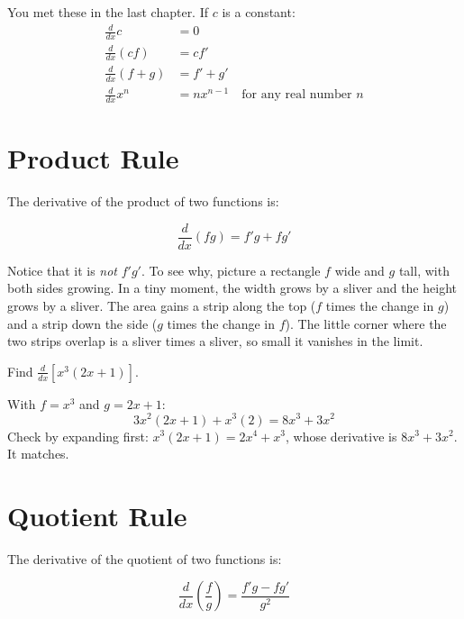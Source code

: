 You met these in the last chapter. If $c$ is a constant:
\begin{align}
\frac{d}{dx}c &= 0\\
\frac{d}{dx}\left(c f\right) &= c f'\\
\frac{d}{dx}\left(f + g\right) &= f' + g'\\
\frac{d}{dx}x^n &= nx^{n-1} \quad \text{for any real number } n
\end{align}

\section{Product Rule}

The derivative of the product of two functions is:

\begin{equation}
\frac{d}{dx}(fg) = f'g + fg'
\end{equation}

Notice that it is \emph{not} $f'g'$. To see why, picture a rectangle $f$
wide and $g$ tall, with both sides growing. In a tiny moment, the width
grows by a sliver and the height grows by a sliver. The area gains a
strip along the top ($f$ times the change in $g$) and a strip down the
side ($g$ times the change in $f$). The little corner where the two strips
overlap is a sliver times a sliver, so small it vanishes in the limit.

\begin{Worked}
\begin{Problem}
Find $\frac{d}{dx}\left[x^3(2x + 1)\right]$.
\end{Problem}
\begin{Solution}
With $f = x^3$ and $g = 2x + 1$:
$$3x^2(2x + 1) + x^3(2) = 8x^3 + 3x^2$$
Check by expanding first: $x^3(2x+1) = 2x^4 + x^3$, whose derivative is
$8x^3 + 3x^2$. It matches.
\end{Solution}
\end{Worked}

\section{Quotient Rule}

The derivative of the quotient of two functions is:

\begin{equation}
\frac{d}{dx}\left(\frac{f}{g}\right) = \frac{f'g - fg'}{g^2}
\end{equation}

